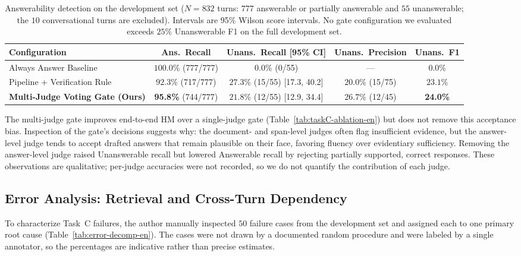\begin{table}[h]
\centering
\small
\begin{tabular}{lcccc}
\toprule
\textbf{Configuration} & \textbf{Ans.\ Recall} & \textbf{Unans.\ Recall [95\% CI]} & \textbf{Unans.\ Precision} & \textbf{Unans.\ F1} \\
\midrule
Always Answer Baseline & $100.0\%$ (777/777) & $0.0\%$ (0/55) & --- & $0.0\%$ \\
Pipeline + Verification Rule & $92.3\%$ (717/777) & $27.3\%$ (15/55) [17.3, 40.2] & $20.0\%$ (15/75) & $23.1\%$ \\
\textbf{Multi-Judge Voting Gate (Ours)} & \textbf{95.8\%} (744/777) & $21.8\%$ (12/55) [12.9, 34.4] & $26.7\%$ (12/45) & \textbf{24.0\%} \\
\bottomrule
\end{tabular}
\caption{Answerability detection on the development set ($N{=}832$ turns: $777$ answerable or partially answerable and $55$ unanswerable; the $10$ conversational turns are excluded). Intervals are 95\% Wilson score intervals. No gate configuration we evaluated exceeds $25\%$ Unanswerable F1 on the full development set.}
\label{tab:answerability-en}
\end{table}

The multi-judge gate improves end-to-end HM over a single-judge gate (Table~\ref{tab:taskC-ablation-en}) but does not remove this acceptance bias. Inspection of the gate's decisions suggests why: the document- and span-level judges often flag insufficient evidence, but the answer-level judge tends to accept drafted answers that remain plausible on their face, favoring fluency over evidentiary sufficiency. Removing the answer-level judge raised Unanswerable recall but lowered Answerable recall by rejecting partially supported, correct responses. These observations are qualitative; per-judge accuracies were not recorded, so we do not quantify the contribution of each judge.

\subsection{Error Analysis: Retrieval and Cross-Turn Dependency}
\label{sec:error-analysis}

To characterize Task~C failures, the author manually inspected $50$ failure cases from the development set and assigned each to one primary root cause (Table~\ref{tab:error-decomp-en}). The cases were not drawn by a documented random procedure and were labeled by a single annotator, so the percentages are indicative rather than precise estimates.

